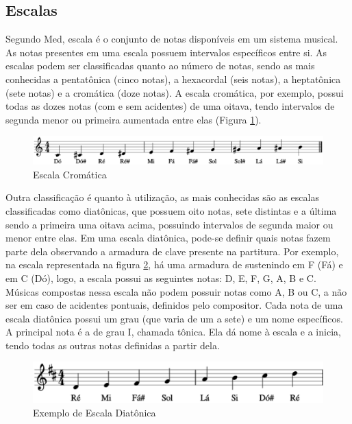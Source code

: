     \subsection[Escalas]{Escalas}

      Segundo Med, escala é o conjunto de notas disponíveis em um sistema musical. As notas presentes em uma escala possuem intervalos específicos entre si. As escalas podem ser classificadas quanto ao número de notas, sendo as mais conhecidas a pentatônica (cinco notas), a hexacordal (seis notas), a heptatônica (sete notas) e a cromática (doze notas). A escala cromática, por exemplo, possui todas as dozes notas (com e sem acidentes) de uma oitava, tendo intervalos de segunda menor ou primeira aumentada entre elas (Figura \ref{cromatica}).

      \begin{figure}[htb]
        \centering
        \includegraphics[scale=0.5]{figuras/cromatica.eps}
        \caption{Escala Cromática}
        \label{cromatica}
      \end{figure}

      Outra classificação é quanto à utilização, as mais conhecidas são as escalas classificadas como diatônicas, que possuem oito notas, sete distintas e a última sendo a primeira uma oitava acima, possuindo intervalos de segunda maior ou menor entre elas. Em uma escala diatônica, pode-se definir quais notas fazem parte dela observando a armadura de clave presente na partitura. Por exemplo, na escala representada na figura \ref{escaladiatonica}, há uma armadura de sustenindo em F (Fá) e em C (Dó), logo, a escala possui as seguintes notas: D, E, F\sh, G, A, B e C\sh. Músicas compostas nessa escala não podem possuir notas como A\fl, B\sh{} ou C, a não ser em caso de acidentes pontuais, definidos pelo compositor. Cada nota de uma escala diatônica possui um grau (que varia de um a sete) e um nome específicos. A principal nota é a de grau I, chamada tônica. Ela dá nome à escala e a inicia, tendo todas as outras notas definidas a partir dela.

      \begin{figure}[htb]
        \centering
        \includegraphics[scale=0.6]{figuras/escalaremaior.eps}
        \caption{Exemplo de Escala Diatônica}
        \label{escaladiatonica}
      \end{figure}

